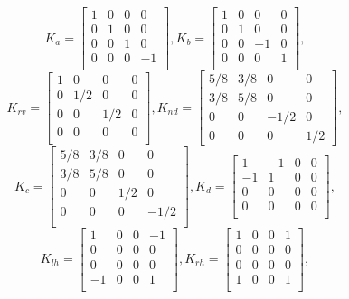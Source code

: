 \documentclass[conference]{IEEEtran}
\begin{document}
\[K_a =
\begin{bmatrix}
1 & 0 & 0 & 0\\
0 & 1 & 0 & 0\\
0 & 0 & 1 & 0\\
0 & 0 & 0 & -1\\
\end{bmatrix},
K_b =
\begin{bmatrix}
1 & 0 & 0 & 0\\
0 & 1 & 0 & 0\\
0 & 0 & -1 & 0\\
0 & 0 & 0 & 1\\
\end{bmatrix},
\]
\[K_{rv} =
\begin{bmatrix}
1 & 0 & 0 & 0\\
0 & 1/2 & 0 & 0\\
0 & 0 & 1/2 & 0\\
0 & 0 & 0 & 0\\
\end{bmatrix},
K_{nd} =
\begin{bmatrix}
5/8 & 3/8 & 0 & 0\\
3/8 & 5/8 & 0 & 0\\
0 & 0 & -1/2 & 0\\
0 & 0 & 0 & 1/2
\end{bmatrix},
\]
\[K_{c} =
\begin{bmatrix}
5/8 & 3/8 & 0 & 0\\
3/8 & 5/8 & 0 & 0\\
0 & 0 & 1/2 & 0\\
0 & 0 & 0 & -1/2\\
\end{bmatrix},
K_d=
\begin{bmatrix}
1 & -1 & 0 & 0\\
-1 & 1 & 0 & 0\\
0 & 0 & 0 & 0\\
0 & 0 & 0 & 0\\
\end{bmatrix},
\]
\[K_{lh}=
\begin{bmatrix}
1 & 0 & 0 & -1\\
0 & 0 & 0 & 0\\
0 & 0 & 0 & 0\\
-1 & 0 & 0 & 1\\
\end{bmatrix},
K_{rh}=
\begin{bmatrix}
1 & 0 & 0 & 1\\
0 & 0 & 0 & 0\\
0 & 0 & 0 & 0\\
1 & 0 & 0 & 1\\
\end{bmatrix}
,\]
\end{document}
